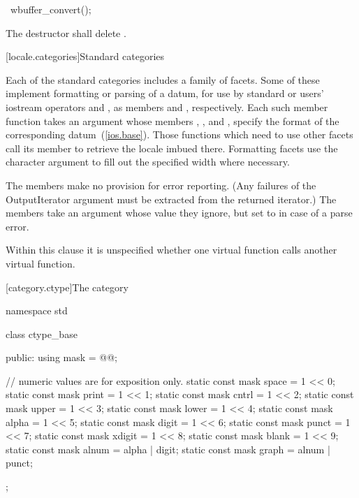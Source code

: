 %
\begin{itemdecl}
~wbuffer_convert();
\end{itemdecl}

\begin{itemdescr}
\pnum
\effects The destructor shall delete .
\end{itemdescr}

[locale.categories]{Standard  categories}

\pnum
Each of the standard categories includes a family of facets.
Some of these implement formatting or parsing of a datum, for use
by standard or users' iostream operators
\tcode{\shl}
and
\tcode{\shr},
as members
and
,
respectively.
Each such member function takes an
%
argument whose members
%
,
%
,
and
%
,
specify the format of the corresponding datum~(\ref{ios.base}).
Those functions which need to use other facets call its member
to retrieve the locale imbued there.
Formatting facets use the character argument
to fill out the specified width where necessary.

\pnum
The
members make no provision for error reporting.
(Any failures of the
OutputIterator argument must be extracted from the returned iterator.)
The
members take an
argument whose value they ignore, but set to
in case of a parse error.

\pnum
Within this clause it is unspecified whether one virtual function calls another
virtual function.

[category.ctype]{The  category}

%
\begin{codeblock}
namespace std {
  class ctype_base {
  public:
    using mask = @@;

    // numeric values are for exposition only.
    static const mask space = 1 << 0;
    static const mask print = 1 << 1;
    static const mask cntrl = 1 << 2;
    static const mask upper = 1 << 3;
    static const mask lower = 1 << 4;
    static const mask alpha = 1 << 5;
    static const mask digit = 1 << 6;
    static const mask punct = 1 << 7;
    static const mask xdigit = 1 << 8;
    static const mask blank = 1 << 9;
    static const mask alnum = alpha | digit;
    static const mask graph = alnum | punct;
  };
}
\end{codeblock}

